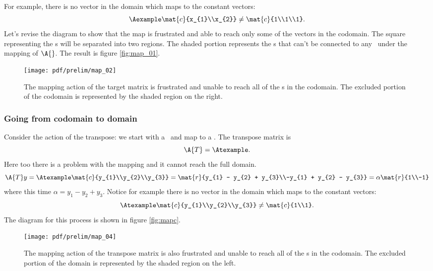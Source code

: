For example, there is no vector in the domain which maps to the constant vectors:
\begin{equation}
  \Aexample \mat{c}{x_{1}\\x_{2}} \ne \mat{c}{1\\1\\1}.
\end{equation}
Let's revise the diagram to show that the map is frustrated and able to reach only some of the vectors in the codomain. The square representing the \vvv s will be separated into two regions. The shaded portion represents the \vvv s that can't be connected to any \vv \ under the mapping of $\A{}$. The result is figure \eqref{fig:map_01}.
\begin{figure}[htbp] %
   \centering
   \texttt{[image: pdf/prelim/map\_02]} 
   \caption[The mapping action of the target matrix is frustrated]{The mapping action of the target matrix is frustrated and unable to reach all of the \vvv s in the codomain. The excluded portion of the codomain is represented by the shaded region on the right.}
   \label{fig:map_01}
\end{figure}

\subsubsection{Going from codomain to domain}
Consider the action of the transpose: we start with a \vvv \  and map to a \vv. The transpose matrix is
\begin{equation}
  \A{T}= \Atexample.
\end{equation}
Here too there is a problem with the mapping and it cannot reach the full domain.
\begin{equation}
  \A{T} y = \Atexample \mat{c}{y_{1}\\y_{2}\\y_{3}} = \mat{r}{y_{1} - y_{2} + y_{3}\\-y_{1} + y_{2} - y_{3}} = \alpha\mat{r}{1\\-1}
\end{equation}
where this time $\alpha = y_{1}-y_{2}+y_{3}$. Notice for example there is no vector in the domain which maps to the constant vectors:
\begin{equation}
  \Atexample \mat{c}{y_{1}\\y_{2}\\y_{3}} \ne \mat{c}{1\\1}.
\end{equation}
The diagram for this process is shown in figure \eqref{fig:mapc}.
\begin{figure}[htbp] %
   \centering
   \texttt{[image: pdf/prelim/map\_04]} 
   \caption[The mapping action of the transpose matrix is also frustrated]{The mapping action of the transpose matrix is also frustrated and unable to reach all of the \vv s in the codomain. The excluded portion of the domain is represented by the shaded region on the left.}
   \label{fig:mapc}
\end{figure}

